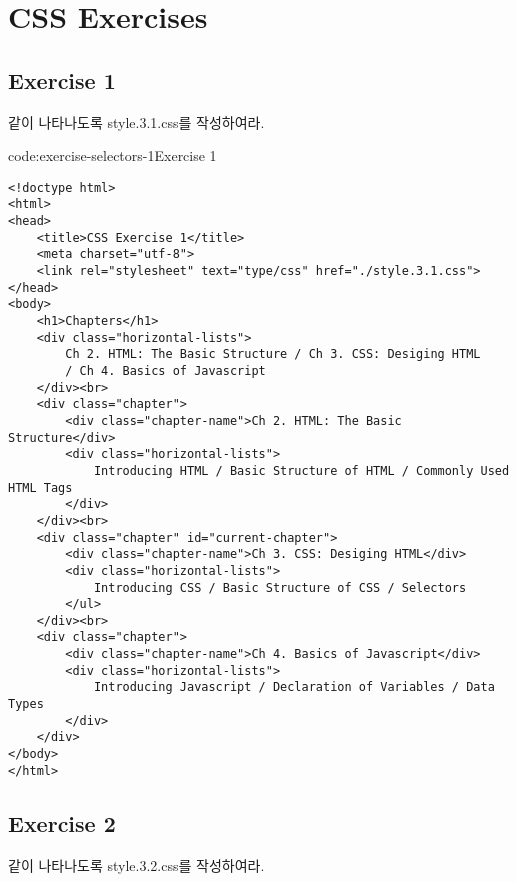 \section{CSS Exercises} \label{sect:css-exercises}

\subsection*{Exercise 1}
\이 \과 같이 나타나도록 style.3.1.css를 작성하여라.

    {}

\begin{codeenv}{code:exercise-selectors-1}{Exercise 1}\begin{verbatim}
<!doctype html>
<html>
<head>
    <title>CSS Exercise 1</title>
    <meta charset="utf-8">
    <link rel="stylesheet" text="type/css" href="./style.3.1.css">
</head>
<body>
    <h1>Chapters</h1>
    <div class="horizontal-lists">
        Ch 2. HTML: The Basic Structure / Ch 3. CSS: Desiging HTML
        / Ch 4. Basics of Javascript
    </div><br>
    <div class="chapter">
        <div class="chapter-name">Ch 2. HTML: The Basic Structure</div>
        <div class="horizontal-lists">
            Introducing HTML / Basic Structure of HTML / Commonly Used HTML Tags
        </div>
    </div><br>
    <div class="chapter" id="current-chapter">
        <div class="chapter-name">Ch 3. CSS: Desiging HTML</div>
        <div class="horizontal-lists">
            Introducing CSS / Basic Structure of CSS / Selectors
        </ul>
    </div><br>
    <div class="chapter">
        <div class="chapter-name">Ch 4. Basics of Javascript</div>
        <div class="horizontal-lists">
            Introducing Javascript / Declaration of Variables / Data Types
        </div>
    </div>
</body>
</html>
\end{verbatim}
\end{codeenv}

\subsection*{Exercise 2}

\이 \과 같이 나타나도록 style.3.2.css를 작성하여라.

    {}


